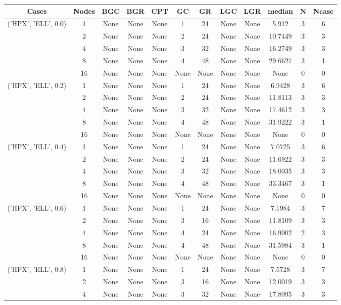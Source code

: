 \begin{tabular}{cccccccccccc}
\hline
Cases & Nodes& BGC& BGR& CPT& GC& GR& LGC& LGR& median & N & Ncase \\
\hline
\multirow{5}{*}{('HPX', 'ELL', 0.0)}& 1& None& None& None& 1& 24& None& None& 5.912& 3& 6\\
& 2& None& None& None& 2& 24& None& None& 10.7449& 3& 3\\
& 4& None& None& None& 3& 32& None& None& 16.2749& 3& 3\\
& 8& None& None& None& 4& 48& None& None& 29.6627& 3& 1\\
& 16& None& None& None& None& None& None& None& None& 0& 0\\
\hline
\multirow{5}{*}{('HPX', 'ELL', 0.2)}& 1& None& None& None& 1& 24& None& None& 6.9428& 3& 6\\
& 2& None& None& None& 2& 24& None& None& 11.8113& 3& 3\\
& 4& None& None& None& 3& 32& None& None& 17.4612& 3& 3\\
& 8& None& None& None& 4& 48& None& None& 31.9222& 3& 1\\
& 16& None& None& None& None& None& None& None& None& 0& 0\\
\hline
\multirow{5}{*}{('HPX', 'ELL', 0.4)}& 1& None& None& None& 1& 24& None& None& 7.0725& 3& 6\\
& 2& None& None& None& 2& 24& None& None& 11.6922& 3& 3\\
& 4& None& None& None& 3& 32& None& None& 18.0035& 3& 3\\
& 8& None& None& None& 4& 48& None& None& 33.3467& 3& 1\\
& 16& None& None& None& None& None& None& None& None& 0& 0\\
\hline
\multirow{5}{*}{('HPX', 'ELL', 0.6)}& 1& None& None& None& 1& 24& None& None& 7.1984& 3& 7\\
& 2& None& None& None& 3& 16& None& None& 11.8109& 3& 3\\
& 4& None& None& None& 4& 24& None& None& 16.9002& 2& 3\\
& 8& None& None& None& 4& 48& None& None& 31.5984& 3& 1\\
& 16& None& None& None& None& None& None& None& None& 0& 0\\
\hline
\multirow{5}{*}{('HPX', 'ELL', 0.8)}& 1& None& None& None& 1& 24& None& None& 7.5728& 3& 7\\
& 2& None& None& None& 3& 16& None& None& 12.0019& 3& 3\\
& 4& None& None& None& 3& 32& None& None& 17.8095& 3& 3\\

\end{tabular}
